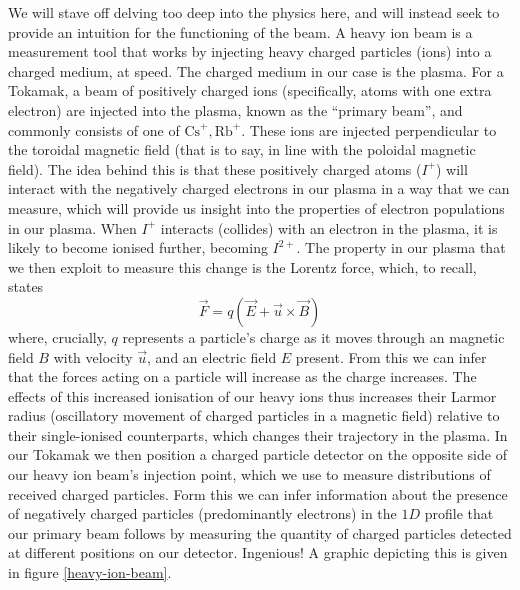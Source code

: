 We will stave off delving too deep into the physics here, and will instead seek to provide an intuition for 
the functioning of the beam. A heavy ion beam is a measurement tool that works by injecting heavy charged 
particles (ions) into a charged medium, at speed. The charged medium in our case is the plasma. For a Tokamak, 
a beam of positively charged ions (specifically, atoms with one extra electron) are injected into the plasma, 
known as the ``primary beam'', and commonly consists of one of $\text{Cs}^{+}, \text{Rb}^{+}$. These 
ions are injected perpendicular to the toroidal magnetic field (that is to say, in line with the poloidal 
magnetic field). The idea behind this is that these positively charged atoms ($I^{+}$) will interact with the negatively charged 
electrons in our plasma in a way that we can measure, which will provide us insight into the properties 
of electron populations in our plasma. When $I^{+}$ interacts (collides) with an electron in the plasma, 
it is likely to become ionised further, becoming $I^{2+}$. The property in our plasma that we then 
exploit to measure this change is the Lorentz force, which, to recall, states 
$$\vec{F} = q(\vec{E} + \vec{u} \times \vec{B})$$
where, crucially, $q$ represents a particle's charge as it moves through an magnetic field $B$ with velocity $\vec{u}$, and an electric field $E$ present. 
From this we can infer that the forces acting on a particle will increase as the charge 
increases. The effects of this increased ionisation of our heavy ions thus increases their Larmor radius
(oscillatory movement of charged particles in a magnetic field) relative to their single-ionised counterparts, 
which changes their trajectory in the plasma. In our Tokamak we then position a charged particle detector on the opposite 
side of our heavy ion beam's injection point, which we use to measure distributions of received charged 
particles. Form this we can infer information about the presence of negatively charged particles 
(predominantly electrons) in the $1D$ profile that our primary beam follows by measuring the 
quantity of charged particles detected at different positions on our detector. Ingenious! A graphic depicting this 
is given in figure \ref{heavy-ion-beam}.

